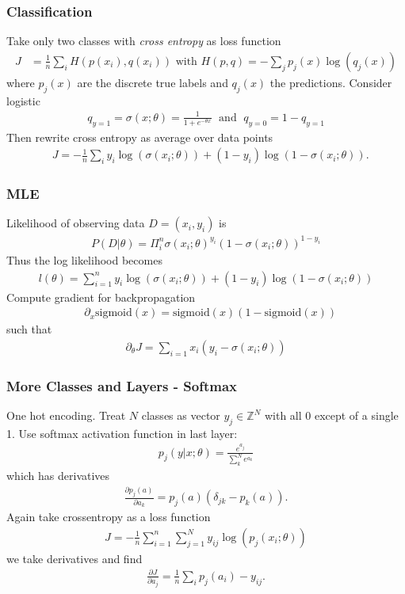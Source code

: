 \documentclass{beamer}
\begin{document}
\begin{frame}
\frametitle{Classification}
Take only two classes with {\it cross entropy} as loss function
\begin{align}
	J & = \frac{1}{n} \sum_i H(p(x_i),q(x_i)) \text{ with } H(p,q) = - \sum_j p_j(x) \log (q_j(x)) 
\end{align}	
where $p_j(x)$ are the discrete true labels and $q_j(x)$ the predictions.
Consider logistic
\begin{align}
q_{y=1} = \sigma (x; \theta)= \frac{1}{1 + e^{-\theta x}} \; \text{ and } \; q_{y=0} = 1- q_{y=1}
\end{align}
Then rewrite cross entropy as average over data points
\begin{align}
	&J = - \frac{1}{n} \sum_i y_i \log ( \sigma (x_i; \theta)) + (1-y_i) \log( 1 - \sigma (x_i; \theta)).
\end{align}

\end{frame}

\begin{frame}
\frametitle{MLE}
Likelihood of observing data $D = (x_i, y_i)$ is
\begin{align}
P(D|\theta) = \Pi_i^{n} \sigma( x_i; \theta)^{y_i} (1 - \sigma( x_i; \theta))^{1-y_i}
\end{align}
Thus the log likelihood becomes
\begin{align}
l(\theta) = \sum_{i=1}^n y_i \log (\sigma(x_i; \theta)) + (1-y_i) \log( 1 - \sigma(x_i; \theta))
\end{align}
\pause
Compute gradient for backpropagation
\begin{align}
	&\partial_x \text{sigmoid}(x) = \text{sigmoid}(x) (1 - \text{sigmoid}(x))
\end{align}
such that
\begin{align}
	\partial_\theta J = \sum_{i=1} x_i (y_i - \sigma(x_i; \theta)) 
\end{align}
\end{frame}

\begin{frame}
\frametitle{More Classes and Layers - Softmax}
One hot encoding. Treat $N$ classes as vector $y_j \in \mathbb{Z}^N$ with all 0 except of a single 1. Use softmax activation function in last layer:
\begin{align}
p_j(y|x ; \theta) = \frac{e^{a_j}}{\sum_k^N e^{a_k}}
\end{align}
which has derivatives
\begin{align}
	\frac{\partial p_j(a)}{\partial a_k} = 
	p_j(a) ( \delta_{jk}- p_k(a)) .
\end{align}
\pause
Again take crossentropy as a loss function
\begin{align}
J = - \frac{1}{n} \sum_{i=1}^n \sum_{j=1}^N  y_{ij} \log (p_j(x_i; \theta))
\end{align}
we take derivatives and find
\begin{align}
	\frac{\partial J}{\partial a_j} = \frac{1}{n} \sum_{i} p_j(a_i) - y_{ij}.
\end{align}
\end{frame}
\end{document}
